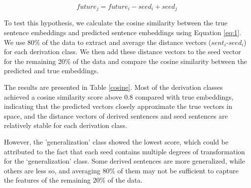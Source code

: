 \documentclass[11pt]{article}
\begin{document}
\begin{equation}
\label{eq:1}
 future_j = future_i - seed_i + seed_j
\end{equation}

To test this hypothesis, we calculate the cosine similarity between the true sentence embeddings and predicted sentence embeddings using Equation \ref{eq:1}. We use 80\% of the data to extract and average the distance vectors ($sent_i$-$seed_i$) for each derivation class. We then add these distance vectors to the seed vector for the remaining 20\% of the data and compare the cosine similarity between the predicted and true embeddings.

The results are presented in Table \ref{cosine}. Most of the derivation classes achieved a cosine similarity score above 0.8 compared with true embeddings, indicating that the predicted vectors closely approximate the true vectors in space, and the distance vectors of derived sentences and seed sentences are relatively stable for each derivation class.

However, the 'generalization' class showed the lowest score, which could be attributed to the fact that each seed contains multiple degrees of transformation for the `generalization' class. Some derived sentences are more generalized, while others are less so, and averaging 80\% of them may not be sufficient to capture the features of the remaining 20\% of the data.
\end{document}
